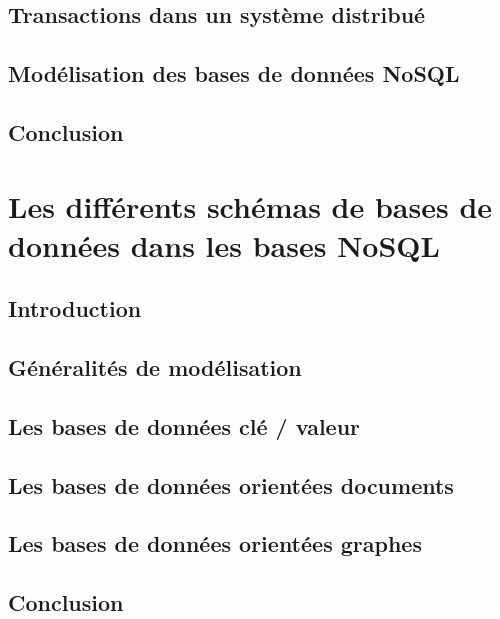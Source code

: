 \documentclass[12pt,titlepage,a4paper]{report}
\begin{document}
		\section{Transactions dans un système distribué}
			

		\section{Modélisation des bases de données NoSQL}
			

		\section*{Conclusion}
			

	\chapter{Les différents schémas de bases de données dans les bases NoSQL}
	\minitoc

		\section*{Introduction}
			

		\section{Généralités de modélisation}
			

		\section{Les bases de données clé / valeur}
			

		\section{Les bases de données orientées documents}
		\label{sec:BDDDocuments}

		\section{Les bases de données orientées graphes}
		\label{sec:BDDGraphes}
			

		\section*{Conclusion}
			

	
	
\end{document}
